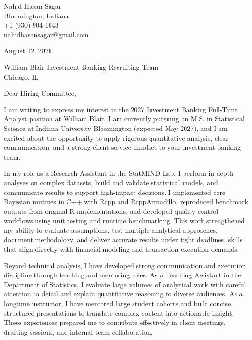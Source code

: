 \documentclass[10pt,letterpaper]{article}
\begin{document}
\begin{flushleft}
Nahid Hasan Sagar\\
Bloomington, Indiana\\
+1 (930) 904-1643\\
nahidhasansagar@gmail.com
\end{flushleft}

\vspace{1em}

August 12, 2026

William Blair Investment Banking Recruiting Team\\
Chicago, IL

\vspace{1em}

Dear Hiring Committee,

I am writing to express my interest in the 2027 Investment Banking Full-Time Analyst position at William Blair. I am currently pursuing an M.S. in Statistical Science at Indiana University Bloomington (expected May 2027), and I am excited about the opportunity to apply rigorous quantitative analysis, clear communication, and a strong client-service mindset to your investment banking team.

In my role as a Research Assistant in the StatMIND Lab, I perform in-depth analyses on complex datasets, build and validate statistical models, and communicate results to support high-impact decisions. I implemented core Bayesian routines in C++ with Rcpp and RcppArmadillo, reproduced benchmark outputs from original R implementations, and developed quality-control workflows using unit testing and runtime benchmarking. This work strengthened my ability to evaluate assumptions, test multiple analytical approaches, document methodology, and deliver accurate results under tight deadlines, skills that align directly with financial modeling and transaction execution demands.

Beyond technical analysis, I have developed strong communication and execution discipline through teaching and mentoring roles. As a Teaching Assistant in the Department of Statistics, I evaluate large volumes of analytical work with careful attention to detail and explain quantitative reasoning to diverse audiences. As a longtime instructor, I have mentored large student cohorts and built concise, structured presentations to translate complex content into actionable insight. These experiences prepared me to contribute effectively in client meetings, drafting sessions, and internal team collaboration.
\end{document}
